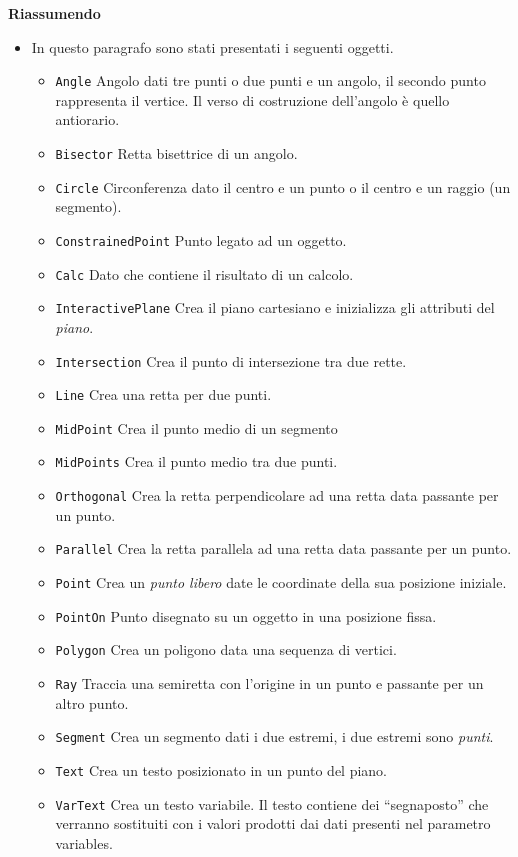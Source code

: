 \textbf{Riassumendo}
\begin{itemize} [noitemsep]
\item In questo paragrafo sono stati presentati i seguenti oggetti.
\begin{itemize} [noitemsep]
\item \texttt{Angle}
Angolo dati tre punti o due punti e un angolo, il secondo punto
rappresenta il vertice.
Il verso di costruzione dell'angolo è quello antiorario.
\item \texttt{Bisector}
Retta bisettrice di un angolo.
\item \texttt{Circle}
Circonferenza dato il centro e un punto o il centro e un raggio
(un segmento).
\item \texttt{ConstrainedPoint}
Punto legato ad un oggetto.
\item \texttt{Calc}
Dato che contiene il risultato di un calcolo.
\item \texttt{InteractivePlane}
Crea il piano cartesiano e inizializza gli attributi del \emph{piano}.
\item \texttt{Intersection}
Crea il punto di intersezione tra due rette.
\item \texttt{Line}
Crea una retta per due punti.
\item \texttt{MidPoint}
Crea il punto medio di un segmento
\item \texttt{MidPoints}
Crea il punto medio tra due punti.
\item \texttt{Orthogonal}
Crea la retta perpendicolare ad una retta data passante per un punto.
\item \texttt{Parallel}
Crea la retta parallela ad una retta data passante per un punto.
\item \texttt{Point}
Crea un \emph{punto libero} date le coordinate della sua posizione iniziale.
\item \texttt{PointOn}
Punto disegnato su un oggetto in una posizione fissa.
\item \texttt{Polygon}
Crea un poligono data una sequenza di vertici.
\item \texttt{Ray}
Traccia una semiretta con l'origine in un punto e passante per un altro
punto.
\item \texttt{Segment}
Crea un segmento dati i due estremi, i due estremi sono \emph{punti}.
\item \texttt{Text}
Crea un testo posizionato in un punto del piano.
\item \texttt{VarText}
Crea un testo variabile. Il testo contiene dei ``segnaposto'' che verranno
sostituiti con i valori prodotti dai dati presenti nel parametro variables.
\end{itemize}


\end{itemize}
